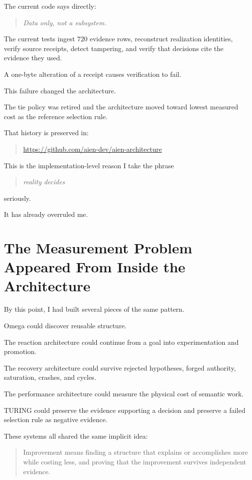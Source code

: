 \documentclass[11pt]{article}
\begin{document}
The current code says directly:

\begin{quote}
\emph{Data only, not a subsystem.}
\end{quote}

The current tests ingest \(720\) evidence rows, reconstruct realization identities, verify source receipts, detect tampering, and verify that decisions cite the evidence they used.

A one-byte alteration of a receipt causes verification to fail.

This failure changed the architecture.

The tie policy was retired and the architecture moved toward lowest measured cost as the reference selection rule.

That history is preserved in:

\begin{quote}
\url{https://github.com/aien-dev/aien-architecture}
\end{quote}

This is the implementation-level reason I take the phrase

\begin{quote}
\emph{reality decides}
\end{quote}

seriously.

It has already overruled me.

\section{The Measurement Problem Appeared From Inside the Architecture}

By this point, I had built several pieces of the same pattern.

Omega could discover reusable structure.

The reaction architecture could continue from a goal into experimentation and promotion.

The recovery architecture could survive rejected hypotheses, forged authority, saturation, crashes, and cycles.

The performance architecture could measure the physical cost of semantic work.

TURING could preserve the evidence supporting a decision and preserve a failed selection rule as negative evidence.

These systems all shared the same implicit idea:

\begin{quote}
Improvement means finding a structure that explains or accomplishes more while costing less, and proving that the improvement survives independent evidence.
\end{quote}
\end{document}
